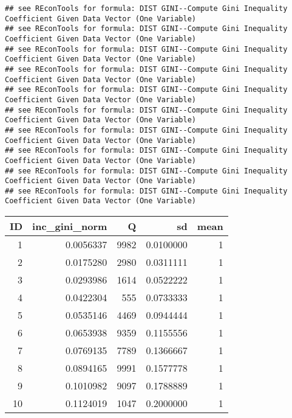 \documentclass[
]{book}
\newenvironment{Shaded}{\begin{snugshade}}{\end{snugshade}}
\newcommand{\CommentTok}[1]{\textcolor[rgb]{0.56,0.35,0.01}{\textit{#1}}}
\newcommand{\KeywordTok}[1]{\textcolor[rgb]{0.13,0.29,0.53}{\textbf{#1}}}
\newcommand{\NormalTok}[1]{#1}
\newcommand{\OperatorTok}[1]{\textcolor[rgb]{0.81,0.36,0.00}{\textbf{#1}}}
\newcommand{\StringTok}[1]{\textcolor[rgb]{0.31,0.60,0.02}{#1}}
\begin{document}
\begin{verbatim}
## see REconTools for formula: DIST GINI--Compute Gini Inequality Coefficient Given Data Vector (One Variable)
## see REconTools for formula: DIST GINI--Compute Gini Inequality Coefficient Given Data Vector (One Variable)
## see REconTools for formula: DIST GINI--Compute Gini Inequality Coefficient Given Data Vector (One Variable)
## see REconTools for formula: DIST GINI--Compute Gini Inequality Coefficient Given Data Vector (One Variable)
## see REconTools for formula: DIST GINI--Compute Gini Inequality Coefficient Given Data Vector (One Variable)
## see REconTools for formula: DIST GINI--Compute Gini Inequality Coefficient Given Data Vector (One Variable)
## see REconTools for formula: DIST GINI--Compute Gini Inequality Coefficient Given Data Vector (One Variable)
## see REconTools for formula: DIST GINI--Compute Gini Inequality Coefficient Given Data Vector (One Variable)
## see REconTools for formula: DIST GINI--Compute Gini Inequality Coefficient Given Data Vector (One Variable)
## see REconTools for formula: DIST GINI--Compute Gini Inequality Coefficient Given Data Vector (One Variable)
\end{verbatim}

\begin{Shaded}
\end{Shaded}

\begin{table}[!h]
\centering
\begin{tabular}{r|r|r|r|r}
\hline
ID & inc\_gini\_norm & Q & sd & mean\\
\hline
\rowcolor{gray!6}  1 & 0.0056337 & 9982 & 0.0100000 & 1\\
\hline
2 & 0.0175280 & 2980 & 0.0311111 & 1\\
\hline
\rowcolor{gray!6}  3 & 0.0293986 & 1614 & 0.0522222 & 1\\
\hline
4 & 0.0422304 & 555 & 0.0733333 & 1\\
\hline
\rowcolor{gray!6}  5 & 0.0535146 & 4469 & 0.0944444 & 1\\
\hline
6 & 0.0653938 & 9359 & 0.1155556 & 1\\
\hline
\rowcolor{gray!6}  7 & 0.0769135 & 7789 & 0.1366667 & 1\\
\hline
8 & 0.0894165 & 9991 & 0.1577778 & 1\\
\hline
\rowcolor{gray!6}  9 & 0.1010982 & 9097 & 0.1788889 & 1\\
\hline
10 & 0.1124019 & 1047 & 0.2000000 & 1\\
\hline
\end{tabular}
\end{table}
\end{document}
